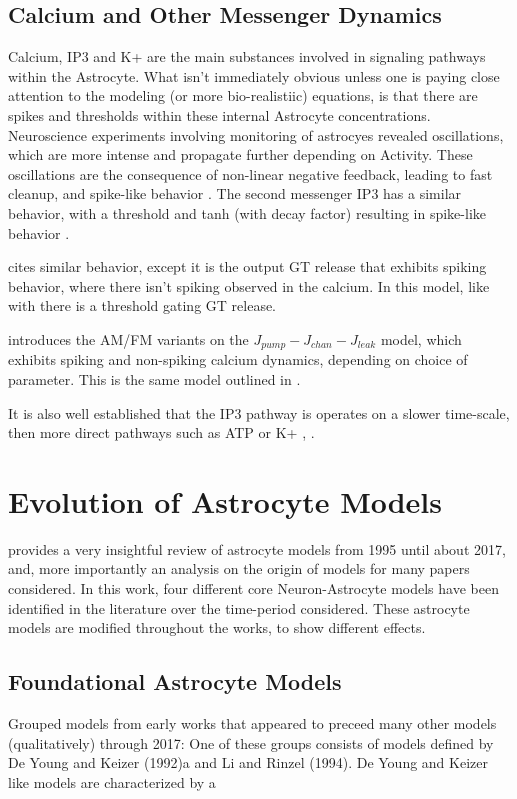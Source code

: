     \subsection{Calcium and Other Messenger Dynamics}
    Calcium, IP3 and K+ are the main substances involved in signaling pathways
    within the Astrocyte. What isn't immediately obvious unless one is paying
    close attention to the modeling (or more bio-realistiic) equations, is that
    there are spikes and thresholds within these internal Astrocyte
    concentrations. Neuroscience experiments involving monitoring of astrocyes
    revealed oscillations, which are more intense and propagate further
    depending on Activity. These oscillations are the consequence of non-linear
    negative feedback, leading to fast cleanup, and spike-like behavior
    \cite{postnov_2009}. The second messenger IP3 has a similar behavior, with a
    threshold and tanh (with decay factor) resulting in spike-like behavior
    \cite{postnov_2009}.

    \cite{wade_2011} cites similar behavior, except it is the output GT release
    that exhibits spiking behavior, where there isn't spiking observed in the
    calcium. In this model, like with \cite{postnov_2009} there is a threshold
    gating GT release.

    \cite{pitta_2009} introduces the AM/FM variants on the $J_{pump} - J_{chan}
    - J_{leak}$ model, which exhibits spiking and non-spiking calcium dynamics,
    depending on choice of parameter. This is the same model outlined in \cite{wade_2011}.

    It is also well established that the IP3 pathway is operates
    on a slower time-scale, then more direct pathways such as ATP or K+
    \cite{postnov_2009}, \cite{bassam_2015}.


    \section{Evolution of Astrocyte Models}
    \cite{manninen_2018} provides a very insightful review of astrocyte models
    from 1995 until about 2017, and, more importantly an analysis on the origin
    of models for many papers considered. In this work, four different core
    Neuron-Astrocyte models have been identified in the literature over the
    time-period considered. These astrocyte models are modified throughout the
    works, to show different effects.

    \subsection{Foundational Astrocyte Models}
    \cite{manninen_2018} Grouped models from early works that appeared to
    preceed many other models (qualitatively) through 2017: One of these groups
    consists of models defined by De Young and Keizer (1992)a and Li and Rinzel
    (1994). De Young and Keizer like models are characterized by a 
    
